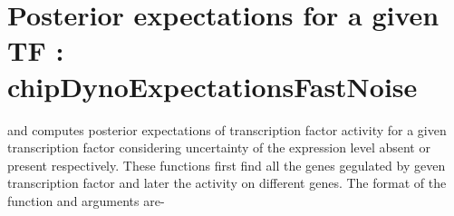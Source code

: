 \documentclass{article}
\begin{document}

\section{Posterior expectations for a given TF : chipDynoExpectationsFastNoise}
 and  computes posterior expectations of transcription factor activity for a given transcription factor considering uncertainty of the expression level  absent or present respectively. These functions first find all the genes gegulated by geven transcription factor and later the activity on different genes. The format of the function and arguments are-
\end{document}
